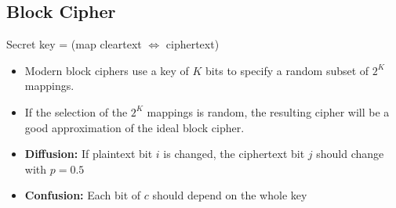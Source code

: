 \subsection{Block Cipher}
Secret key = (map cleartext $\Leftrightarrow$ ciphertext)
\begin{itemize}
	\item Modern block ciphers use a key of $K$ bits to specify a random
subset of $2^K$ mappings.
\item If the selection of the $2^K$ mappings is random, the resulting
cipher will be a good approximation of the ideal block cipher.
\item \textbf{Diffusion:} If plaintext bit $i$ is changed, the ciphertext bit $j$ should
  change with $p=0.5$
\item \textbf{Confusion:} Each bit of $c$ should depend on the whole key
\end{itemize}

